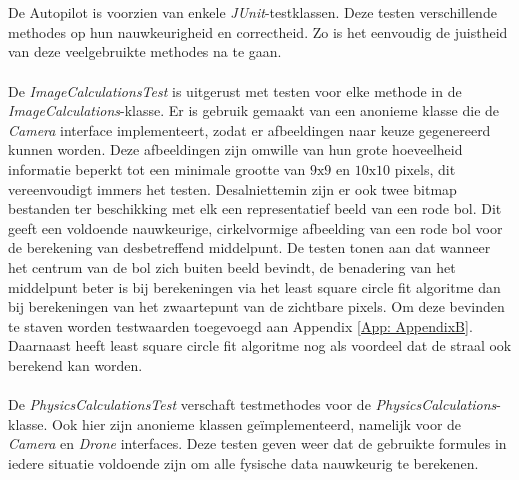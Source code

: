 \\
\\
De Autopilot is voorzien van enkele \textit{JUnit}-testklassen. Deze testen verschillende methodes op hun nauwkeurigheid en correctheid. Zo is het eenvoudig de juistheid van deze veelgebruikte methodes na te gaan.
\\
\\
De \textit{ImageCalculationsTest} is uitgerust met testen voor elke methode in de \textit{ImageCalculations}-klasse. Er is gebruik gemaakt van een anonieme klasse die de \textit{Camera} interface implementeert, zodat er afbeeldingen naar keuze gegenereerd kunnen worden. Deze afbeeldingen zijn omwille van hun grote hoeveelheid informatie beperkt tot een minimale grootte van \(9\text{x}9\) en \(10\text{x}10\) pixels, dit vereenvoudigt immers het testen. Desalniettemin zijn er ook twee bitmap bestanden ter beschikking met elk een representatief beeld van een rode bol. Dit geeft een voldoende nauwkeurige, cirkelvormige afbeelding van een rode bol voor de berekening van desbetreffend middelpunt. De testen tonen aan dat wanneer het centrum van de bol zich buiten beeld bevindt, de benadering van het middelpunt beter is bij berekeningen via het least square circle fit algoritme dan bij berekeningen van het zwaartepunt van de zichtbare pixels. Om deze bevinden te staven worden testwaarden toegevoegd aan Appendix \ref{App: AppendixB}. Daarnaast heeft least square circle fit algoritme nog als voordeel dat de straal ook berekend kan worden.
\\
\\
De \textit{PhysicsCalculationsTest} verschaft testmethodes voor de \textit{PhysicsCalculations}-klasse. Ook hier zijn anonieme klassen ge\"implementeerd, namelijk voor de \textit{Camera} en \textit{Drone} interfaces. Deze testen geven weer dat de gebruikte formules in iedere situatie voldoende zijn om alle fysische data nauwkeurig te berekenen.

